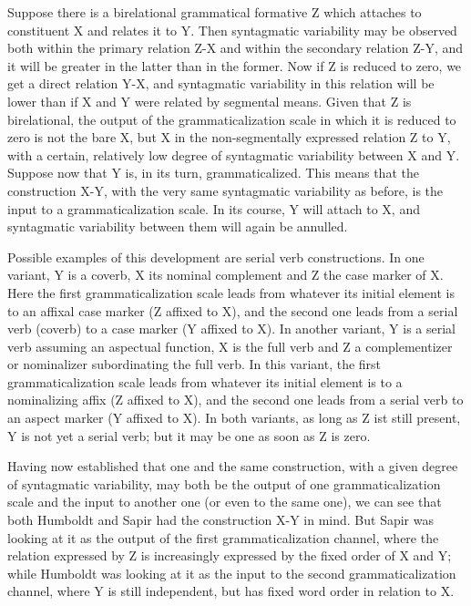 Suppose there is a birelational grammatical formative Z which attaches to constituent X and relates it to Y. Then syntagmatic variability may be observed both within the primary relation Z-X and within the secondary relation Z-Y, and it will be greater in the latter than in the former. Now if Z is reduced to zero, we get a direct relation Y-X, and syntagmatic variability in this relation will be lower than if X and Y were related by segmental means. Given that Z is birelational, the output of the grammaticalization scale in which it is reduced to zero is not the bare X, but X in the non-segmentally expressed relation Z to Y, with a certain, relatively low degree of syntagmatic variability between X and Y. Suppose now that Y is, in its turn, grammaticalized. This means that the construction X-Y, with the very same syntagmatic variability as before, is the input to a grammaticalization scale. In its course, Y will attach to X, and syntagmatic variability between them will again be annulled.

Possible examples of this development are serial verb constructions. In one variant, Y is a coverb, X its nominal complement and Z the case marker of X. Here the first grammaticalization scale leads from whatever its initial element is to an affixal case marker (Z affixed to X), and the second one leads from a serial verb (coverb) to a case marker (Y affixed to X). In another variant, Y is a serial verb assuming an aspectual function, X is the full verb and Z a complementizer or nominalizer subordinating the full verb. In this variant, the first grammaticalization scale leads from whatever its initial element is to a nominalizing affix (Z affixed to X), and the second one leads from a serial verb to an aspect marker (Y affixed to X). In both variants, as long as Z ist still present, Y is not yet a serial verb; but it may be one as soon as Z is zero.

Having now established that one and the same construction, with a given degree of syntagmatic variability, may both be the output of one grammaticalization scale and the input to another one (or even to the same one), we can see that both Humboldt and Sapir had the construction X-Y in mind. But Sapir was looking at it as the output of the first grammaticalization channel, where the relation expressed by Z is increasingly expressed by the fixed order of X and Y; while Humboldt was looking at it as the input to the second grammaticalization channel, where Y is still independent, but has fixed word order in relation to X.

